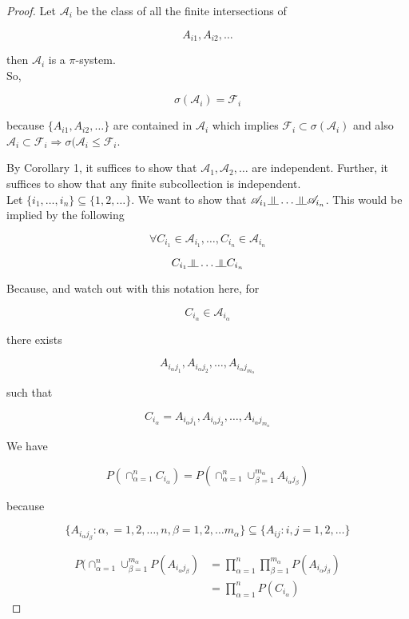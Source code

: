 \documentclass[11pt,fleqn]{book} %
\newcommand{\indep}{\rotatebox[origin=c]{90}{$\models$}}
\begin{document}
\begin{proof}
	Let $\mathscr{A}_i$ be the class of all the finite intersections of 

	$$A_{i1}, A_{i2}, \dots$$

	then $\mathscr{A}_i$ is a $\pi$-system. \\

	So, 

	$$\sigma(\mathscr{A}_i) = \mathscr{F}_i $$

	because $\{A_{i1}, A_{i2}, \dots \}$ are contained in $\mathscr{A}_i$ which implies $\mathscr{F}_i \subset \sigma(\mathscr{A}_i)$ and also $\mathscr{A}_i \subset \mathscr{F}_i \Rightarrow \sigma(\mathscr{A}_i \leq \mathscr{F}_i$.

	By Corollary 1, it suffices to show that $\mathscr{A}_1, \mathscr{A}_2, \dots$ are independent. Further, it suffices to show that any finite subcollection is independent.\\

	Let $\{i_1, \dots, i_n \} \subseteq \{1, 2, \dots \}$. We want to show that $\mathscr{A}_{i_1}\indep \dots \indep \mathscr{A}_{i_n}$. This would be implied by the following

	$$\forall C_{i_1} \in \mathscr{A}_{i_1}, \dots, C_{i_n} \in \mathscr{A}_{i_n} $$

	$$C_{i_1} \indep \dots \indep C_{i_n}$$

	Because, and watch out with this notation here, for

			$$C_{i_\alpha} \in \mathscr{A}_{i_\alpha} $$

		there exists

		$${A}_{i_\alpha j_1}, {A}_{i_\alpha j_2}, \dots, {A}_{i_\alpha j_{m_\alpha}} $$

		such that

		$$C_{i_\alpha} = {A}_{i_\alpha j_1}, {A}_{i_\alpha j_2}, \dots, {A}_{i_\alpha j_{m_\alpha}} $$

		We have

		$$ P(\cap^n_{\alpha = 1} C_{i_\alpha}) = P(\cap^n_{\alpha = 1} \cup^{m_\alpha}_{\beta = 1} A_{i_\alpha j_\beta})$$

		because 

		$$\{A_{i_\alpha j_\beta}: \alpha, = 1, 2, \dots, n , \beta = 1, 2, \dots m_\alpha\} \subseteq \{ A_{ij}: i, j = 1, 2, \dots\}$$

		\begin{align*}
			P(\cap^n_{\alpha = 1} \cup^{m_\alpha}_{\beta = 1} P(A_{i_\alpha j_\beta}) &= \displaystyle \prod^n_{\alpha = 1} \prod^{m_\alpha}_{\beta = 1} P(A_{i_\alpha j_\beta})\\
			&= \displaystyle \prod^n_{\alpha = 1} P(C_{i_\alpha})
		\end{align*}
\end{proof}
\end{document}

